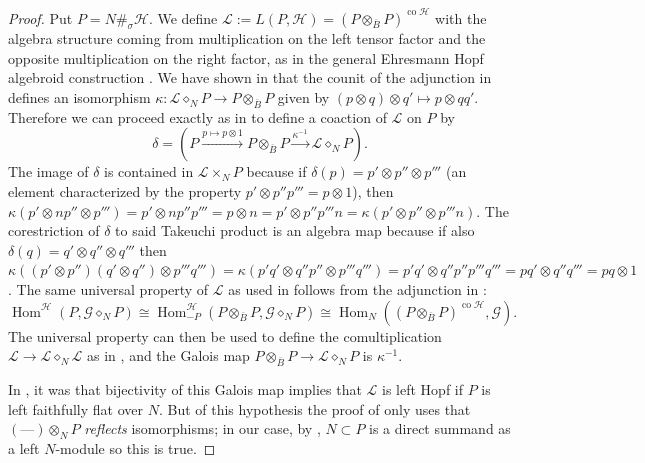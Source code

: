 \documentclass[a4paper,reqno]{amsart}
\DeclareMathOperator{\Hom}{Hom}
\numberwithin{equation}{section}
\theoremstyle{plain}
\theoremstyle{remark}
\numberwithin{equation}{section}
\newcommand{\ot}{\otimes}
\newcommand\ol{\overline}
\newcommand\ou[1]{\otimes_{#1}}
\newcommand{\CH}{\mathcal{H}}
\newcommand{\CL}{\mathcal{L}}
\newcommand\co{{\operatorname{co}}}
\begin{document}
\begin{proof}
   Put $P=N\#_\sigma\CH$. We define $\CL:=L(P,\CH)=(P\ou{\ol B}P)^{\co\CH}$ with the algebra structure coming from multiplication on the left tensor factor and the opposite multiplication on the right factor, as in the general Ehresmann Hopf algebroid construction . We have shown in  that the counit of the adjunction in  defines an isomorphism  $\kappa\colon\CL\diamond_NP\to P\ou{\ol B}P$ given by $(p\ot q)\ot q'\mapsto p\ot qq'$. Therefore we can proceed exactly as in \cite{HS25} to define a coaction of $\CL$ on $P$ 
   by
    \[\delta=(P\xrightarrow{p\mapsto p\ot 1}P\ou{\ol B}P\xrightarrow{\kappa^{-1}}\CL\diamond_NP).\]
   The image of $\delta$ is contained in $\CL\times_NP$ because if $\delta(p)=p'\ot p''\ot p'''$ (an element characterized by the property $p'\ot p''p'''=p\ot 1$), then $\kappa(p'\ot np''\ot p''')=p'\ot np''p'''=p\ot n=p'\ot p''p'''n=\kappa(p'\ot p''\ot p'''n)$. The corestriction of $\delta$ to said Takeuchi product is an algebra map because if also $\delta(q)=q'\ot q''\ot q'''$ then $\kappa((p'\ot p'')(q'\ot q'')\ot p'''q''')=\kappa(p'q'\ot q''p''\ot p'''q''')=p'q'\ot q''p''p'''q'''=pq'\ot q''q'''=pq\ot 1$. The same universal property of $\CL$ as used in \cite{HS25} follows from the adjunction in :
   \[\Hom^\CH(P,\mathcal G\diamond_N P)\cong\Hom^\CH_{-P}(P\ou{\ol B}P,\mathcal G\diamond_N P)\cong\Hom_N((P\ou{\ol B}P)^{\co\CH},\mathcal G).\]
   The universal property can then be used to define the comultiplication $\CL\to\CL\diamond_N\CL$ as in \cite{HS25}, and the Galois map $P\ou{\ol B}P\to\CL\diamond_NP$ is $\kappa^{-1}$.


   In \cite[Lemma 3.21]{HS25}, it was that bijectivity of this Galois map implies that $\CL$ is left Hopf if $P$ is left faithfully flat over $N$. But of this hypothesis the proof of \cite[Lemma 3.21]{HS25} only uses that $(\text{---})\ou NP$ \emph{reflects} isomorphisms; in our case, by , $N\subset P$ is a direct summand as a left $N$-module so this is true.

  
   


\end{proof}
\end{document}
